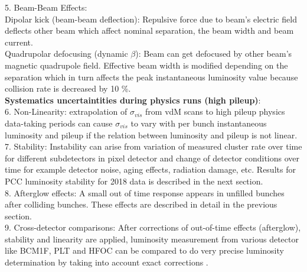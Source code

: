 5. Beam-Beam Effects: \\

Dipolar kick (beam-beam deflection): Repulsive force due to beam's electric field deflects other beam which affect nominal separation, the beam width and beam current. \\
Quadrupolar defocusing (dynamic $\beta$): Beam can get defocused by other beam's magnetic quadrupole field. Effective beam width is modified depending on the separation which in turn affects the peak instantaneous luminosity value because collision rate is decreased by 10 \%. \\

\textbf{Systematics uncertaintities during physics runs (high pileup)}:\\

6. Non-Linearity: extrapolation of $\sigma_{vis}$ from vdM scans to high pileup physics data-taking periods can cause $\sigma_{vis}$ to vary with per bunch instantaneous luminosity and pileup if the relation between luminosity and pileup is not linear.                               \\

7. Stability: Instability can arise from variation of measured cluster rate over time for different subdetectors in pixel detector and change of detector conditions over time for example detector noise, aging effects, radiation damage, etc. Results for PCC luminosity stability for 2018 data is described in the next section.                               \\

8. Afterglow effects: A small out of time response appears in unfilled bunches after colliding bunches. These effects are described in detail in the previous section. \\


9. Cross-detector comparisons: After corrections of out-of-time effects (afterglow), stability and linearity are applied, luminosity measurement from various detector like BCM1F, PLT and HFOC can be compared to do very precise luminosity determination by taking into account exact corrections \cite{CMS-PAS-LUM-18-002}. 



